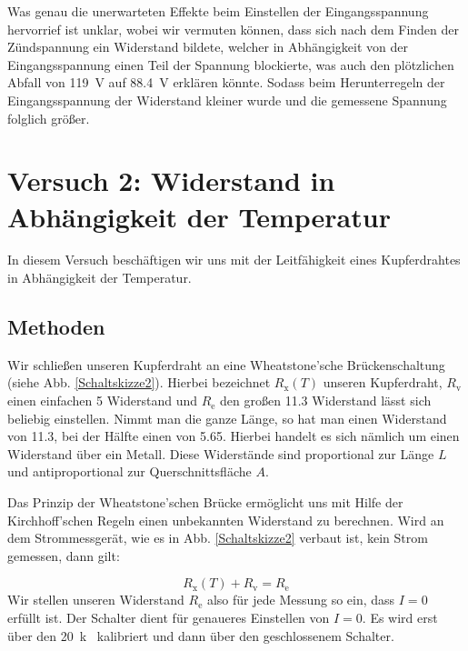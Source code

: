 \documentclass[11pt,a4paper,titlepage, ngerman]{article}
\begin{document}
				Was genau die unerwarteten Effekte beim Einstellen der Eingangsspannung hervorrief ist unklar, wobei wir vermuten können, dass sich nach dem Finden der Zündspannung ein Widerstand bildete, welcher in Abhängigkeit von der Eingangsspannung einen Teil der Spannung blockierte, was auch den plötzlichen Abfall von \SI{119}{\V} auf \SI{88.4}{\V} erklären könnte. Sodass beim Herunterregeln der Eingangsspannung der Widerstand kleiner wurde und die gemessene Spannung folglich größer.  
			
	\section{Versuch 2: Widerstand in Abhängigkeit der Temperatur}		
		
		In diesem Versuch beschäftigen wir uns mit der Leitfähigkeit eines Kupferdrahtes in Abhängigkeit der Temperatur.
		
		\subsection{Methoden} %
		
			Wir schließen unseren Kupferdraht an eine Wheatstone'sche Brückenschaltung (siehe Abb. \ref{Schaltskizze2}). Hierbei bezeichnet $R_\text{x}(T)$ unseren Kupferdraht, $R_\text{v}$ einen einfachen \SI{5}{\Omega} Widerstand und $R_\text{e}$ den großen \SI{11,3}{\Omega} Widerstand lässt sich beliebig einstellen. Nimmt man die ganze Länge, so hat man einen Widerstand von \SI{11,3}{\Omega}, bei der Hälfte einen von \SI{5,65}{\Omega}. Hierbei handelt es sich nämlich um einen Widerstand über ein Metall. Diese Widerstände sind proportional zur Länge $L$ und antiproportional zur Querschnittsfläche $A$.
			
			Das Prinzip der Wheatstone'schen Brücke ermöglicht uns mit Hilfe der Kirchhoff'schen Regeln einen unbekannten Widerstand zu berechnen.
			Wird an dem Strommessgerät, wie es in Abb. \ref{Schaltskizze2} verbaut ist, kein Strom gemessen, dann gilt:
			
			\begin{equation*}
				R_\text{x}(T) + R_\text{v} =  R_\text{e}
			\end{equation*}
			Wir stellen unseren Widerstand $R_\text{e}$ also für jede Messung so ein, dass $I = 0$ erfüllt ist. Der Schalter dient für genaueres Einstellen von $I = 0$. Es wird erst über den \SI{20}{k\Omega} kalibriert und dann über den geschlossenem Schalter.
			
\end{document}
